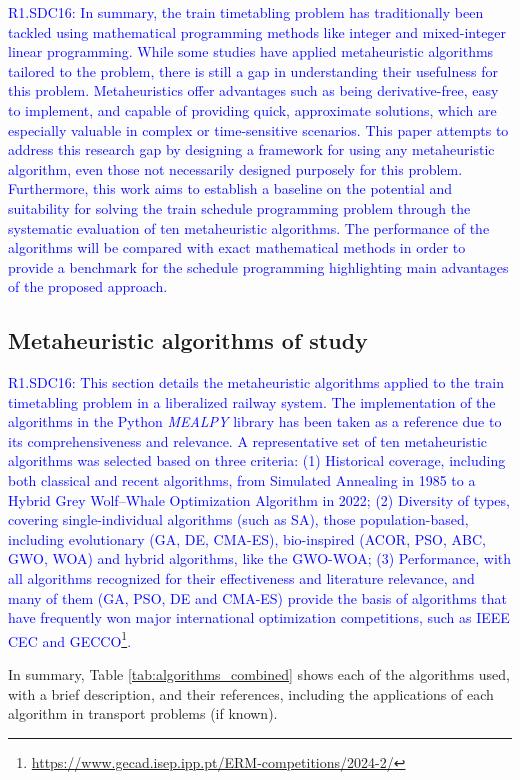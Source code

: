 \documentclass[Afour,sagev,times]{sagej}
\newcommand{\primero}[1]{\textcolor{blue}{#1}}
\begin{document}
\primero{R1.SDC16: In summary, the train timetabling problem has traditionally been tackled using mathematical programming methods like integer and mixed-integer linear programming. While some studies have applied metaheuristic algorithms tailored to the problem, there is still a gap in understanding their usefulness for this problem. Metaheuristics offer advantages such as being derivative-free, easy to implement, and capable of providing quick, approximate solutions, which are especially valuable in complex or time-sensitive scenarios. 
This paper attempts to address this research gap by designing a framework for using any metaheuristic algorithm, even those not necessarily designed purposely for this problem. Furthermore, this work aims to establish a baseline on the potential and suitability for solving the train schedule programming problem through the systematic evaluation of ten metaheuristic algorithms. The performance of the algorithms will be compared with exact mathematical methods in order to provide a benchmark for the schedule programming highlighting main advantages of the proposed approach.}

\subsection{Metaheuristic algorithms of study}
\primero{R1.SDC16: This section details the metaheuristic algorithms applied to the train timetabling problem in a liberalized railway system. The implementation of the algorithms in the Python \textit{MEALPY} library has been taken as a reference due to its comprehensiveness and relevance. A representative set of ten metaheuristic algorithms was selected based on three criteria: (1) Historical coverage, including both classical and recent algorithms, from Simulated Annealing in 1985 to a Hybrid Grey Wolf–Whale Optimization Algorithm in 2022; (2) Diversity of types, covering single-individual algorithms (such as SA), those population-based, including evolutionary (GA, DE, CMA-ES), bio-inspired (ACOR, PSO, ABC, GWO, WOA) and hybrid algorithms, like the GWO-WOA; (3) Performance, with all algorithms recognized for their effectiveness and literature relevance, and many of them (GA, PSO, DE and CMA-ES) provide the basis of algorithms that have frequently won major international optimization competitions, such as IEEE CEC \cite{Qiao24} and GECCO\footnote{\url{https://www.gecad.isep.ipp.pt/ERM-competitions/2024-2/}}.}


In summary, Table \ref{tab:algorithms_combined} shows each of the algorithms used, with a brief description, and their references, including the applications of each algorithm in transport problems (if known).
\end{document}
